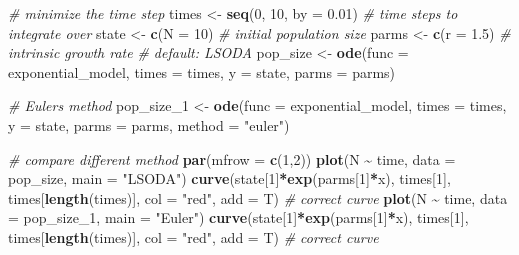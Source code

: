 \documentclass[
]{book}
\newenvironment{Shaded}{\begin{snugshade}}{\end{snugshade}}
\newcommand{\AttributeTok}[1]{\textcolor[rgb]{0.13,0.29,0.53}{#1}}
\newcommand{\CommentTok}[1]{\textcolor[rgb]{0.56,0.35,0.01}{\textit{#1}}}
\newcommand{\DecValTok}[1]{\textcolor[rgb]{0.00,0.00,0.81}{#1}}
\newcommand{\FloatTok}[1]{\textcolor[rgb]{0.00,0.00,0.81}{#1}}
\newcommand{\FunctionTok}[1]{\textcolor[rgb]{0.13,0.29,0.53}{\textbf{#1}}}
\newcommand{\NormalTok}[1]{#1}
\newcommand{\OtherTok}[1]{\textcolor[rgb]{0.56,0.35,0.01}{#1}}
\newcommand{\SpecialCharTok}[1]{\textcolor[rgb]{0.81,0.36,0.00}{\textbf{#1}}}
\newcommand{\StringTok}[1]{\textcolor[rgb]{0.31,0.60,0.02}{#1}}
\begin{document}
\begin{Shaded}
\begin{Highlighting}[]
\CommentTok{\# minimize the time step}
\NormalTok{times }\OtherTok{\textless{}{-}} \FunctionTok{seq}\NormalTok{(}\DecValTok{0}\NormalTok{, }\DecValTok{10}\NormalTok{, }\AttributeTok{by =} \FloatTok{0.01}\NormalTok{)  }\CommentTok{\# time steps to integrate over}
\NormalTok{state }\OtherTok{\textless{}{-}} \FunctionTok{c}\NormalTok{(}\AttributeTok{N =} \DecValTok{10}\NormalTok{)  }\CommentTok{\# initial population size}
\NormalTok{parms }\OtherTok{\textless{}{-}} \FunctionTok{c}\NormalTok{(}\AttributeTok{r =} \FloatTok{1.5}\NormalTok{)  }\CommentTok{\# intrinsic growth rate}
\CommentTok{\# default: LSODA}
\NormalTok{pop\_size }\OtherTok{\textless{}{-}} \FunctionTok{ode}\NormalTok{(}\AttributeTok{func =}\NormalTok{ exponential\_model, }\AttributeTok{times =}\NormalTok{ times, }\AttributeTok{y =}\NormalTok{ state, }\AttributeTok{parms =}\NormalTok{ parms)}

\CommentTok{\# Euler\textquotesingle{}s method}
\NormalTok{pop\_size\_1 }\OtherTok{\textless{}{-}} \FunctionTok{ode}\NormalTok{(}\AttributeTok{func =}\NormalTok{ exponential\_model, }\AttributeTok{times =}\NormalTok{ times, }\AttributeTok{y =}\NormalTok{ state, }\AttributeTok{parms =}\NormalTok{ parms, }\AttributeTok{method =} \StringTok{"euler"}\NormalTok{)}

\CommentTok{\# compare different method}
\FunctionTok{par}\NormalTok{(}\AttributeTok{mfrow =} \FunctionTok{c}\NormalTok{(}\DecValTok{1}\NormalTok{,}\DecValTok{2}\NormalTok{))}
\FunctionTok{plot}\NormalTok{(N }\SpecialCharTok{\textasciitilde{}}\NormalTok{ time, }\AttributeTok{data =}\NormalTok{ pop\_size, }\AttributeTok{main =} \StringTok{"LSODA"}\NormalTok{)}
\FunctionTok{curve}\NormalTok{(state[}\DecValTok{1}\NormalTok{]}\SpecialCharTok{*}\FunctionTok{exp}\NormalTok{(parms[}\DecValTok{1}\NormalTok{]}\SpecialCharTok{*}\NormalTok{x), times[}\DecValTok{1}\NormalTok{], times[}\FunctionTok{length}\NormalTok{(times)], }\AttributeTok{col =} \StringTok{"red"}\NormalTok{, }\AttributeTok{add =}\NormalTok{ T) }\CommentTok{\# correct curve}
\FunctionTok{plot}\NormalTok{(N }\SpecialCharTok{\textasciitilde{}}\NormalTok{ time, }\AttributeTok{data =}\NormalTok{ pop\_size\_1, }\AttributeTok{main =} \StringTok{"Euler"}\NormalTok{)}
\FunctionTok{curve}\NormalTok{(state[}\DecValTok{1}\NormalTok{]}\SpecialCharTok{*}\FunctionTok{exp}\NormalTok{(parms[}\DecValTok{1}\NormalTok{]}\SpecialCharTok{*}\NormalTok{x), times[}\DecValTok{1}\NormalTok{], times[}\FunctionTok{length}\NormalTok{(times)], }\AttributeTok{col =} \StringTok{"red"}\NormalTok{, }\AttributeTok{add =}\NormalTok{ T) }\CommentTok{\# correct curve}
\end{Highlighting}
\end{Shaded}
\end{document}
